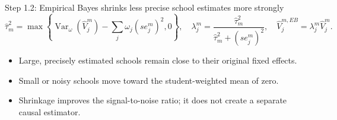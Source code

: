 \documentclass[11pt,aspectratio=169]{beamer}
\let\oldparencite\parencite
\renewcommand{\parencite}[2][]{%
  \footnotesize {\tiny \oldparencite[#1]{#2}} \normalsize%
}
\newenvironment{wideitemize}{%
  \begin{minipage}{0.92\textwidth}
  \begin{itemize}
  \addtolength{\itemsep}{0.75em}
}{%
  \end{itemize}
  \end{minipage}
}
\begin{document}
\begin{frame}{Step 1.2: Empirical Bayes shrinks less precise school estimates more strongly}
\small
\[
\widehat\tau_m^2
=
\max\left\{
\operatorname{Var}_{\omega}(\widehat V_j^m)
-\sum_j\omega_j(se_j^m)^2,
0
\right\},
\quad
\lambda_j^m
=
\frac{\widehat\tau_m^2}{\widehat\tau_m^2+(se_j^m)^2},
\quad
\widehat V_j^{m,EB}=\lambda_j^m\widehat V_j^m.
\]

\begin{wideitemize}
  \item Large, precisely estimated schools remain close to their original fixed effects.
  \item Small or noisy schools move toward the student-weighted mean of zero. \parencite{walters_chapter_2024}
  \item Shrinkage improves the signal-to-noise ratio; it does not create a separate causal estimator.
\end{wideitemize}
\end{frame}
\end{document}
